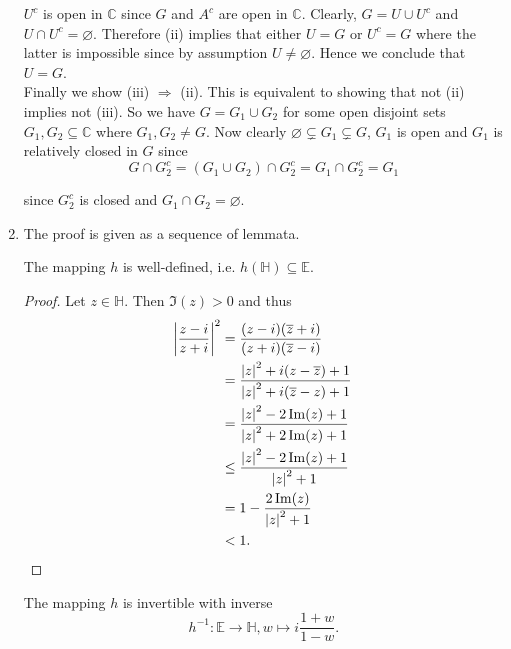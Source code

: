 \begin{enumerate}[label = \textbf{Exercise \arabic*.},wide = 0pt, itemsep=1.5ex]
	\noindent $U^c$ is open in $\mathbb{C}$ since $G$ and $A^c$ are open in $\mathbb{C}$. Clearly, $G = U \cup U^c$ and $U \cap U^c = \varnothing$. Therefore (ii) implies that either $U = G$ or $U^c = G$ where the latter is impossible since by assumption $U \neq \varnothing$. Hence we conclude that $U = G$.\\
	Finally we show (iii) $\Rightarrow$ (ii). This is equivalent to showing that not (ii) implies not (iii). So we have $G = G_1 \cup G_2$ for some open disjoint sets $G_1, G_2 \subseteq \mathbb{C}$ where $G_1,G_2 \neq G$. Now clearly $\varnothing \subsetneq G_1 \subsetneq G$, $G_1$ is open and $G_1$ is relatively closed in $G$ since
	\begin{equation*}
		G \cap G_2^c = (G_1 \cup G_2) \cap G_2^c = G_1 \cap G_2^c = G_1
	\end{equation*}

	\noindent since $G_2^c$ is closed and $G_1 \cap G_2 = \varnothing$.

\item The proof is given as a sequence of lemmata.
	\begin{lemma}
		The mapping $h$ is well-defined, i.e. $h(\mathbb{H}) \subseteq \mathbb{E}$.
		\label{lem:well_defined}
	\end{lemma}

	\begin{proof}
		 Let $z \in \mathbb{H}$. Then $\Im(z) > 0$ and thus
	\begin{align*}
		\abs[3]{\frac{z - i}{z + i}}^2 &= \frac{(z - i)(\overline{z} + i)}{(z + i)(\overline{z} - i)}\\
		&= \frac{\abs[0]{z}^2 + i(z - \overline{z}) + 1}{\abs[0]{z}^2 + i( \overline{z} - z) + 1}\\
		&= \frac{\abs[0]{z}^2 -2 \Im (z) + 1}{\abs[0]{z}^2 + 2\Im(z) + 1}\\
		&\leq \frac{\abs[0]{z}^2 -2 \Im (z) + 1}{\abs[0]{z}^2 + 1}\\
		&= 1 - \frac{2\Im(z)}{\abs[0]{z}^2 + 1}\\
		& < 1.
	\end{align*}
	\end{proof}
	
	\begin{lemma}
		The mapping $h$ is invertible with inverse
		\begin{equation}
			h^{-1}: \mathbb{E} \to \mathbb{H}, w \mapsto i\frac{1 + w}{1 - w}.
		\end{equation}
		\label{lem:invertible}
	\end{lemma}


\end{enumerate}
